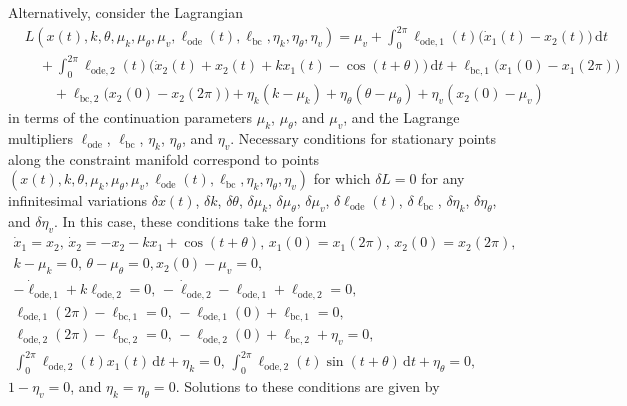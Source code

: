 Alternatively, consider the Lagrangian
\begin{align}
&L\left(x(t),k,\theta,\mu_k,\mu_\theta,\mu_v,\ell_\mathrm{ode}(t),\ell_\mathrm{bc},\eta_k,\eta_\theta,\eta_v\right)=\mu_v+\int_0^{2\pi}\ell_{\mathrm{ode},1}(t)\big(\dot{x}_1(t)-x_2(t)\big)\,\mathrm{d}t\nonumber\\
&\quad+\int_0^{2\pi}\ell_{\mathrm{ode},2}(t)\big(\dot{x}_2(t)+x_2(t)+kx_1(t)-\cos(t+\theta)\big)\,\mathrm{d}t+\ell_{\mathrm{bc},1}\big(x_1(0)-x_1(2\pi)\big)\nonumber\\
&\quad\quad+\ell_{\mathrm{bc},2}\big(x_2(0)-x_2(2\pi)\big)+\eta_k\left(k-\mu_k\right)+\eta_\theta\left(\theta-\mu_\theta\right)+\eta_v\left(x_2(0)-\mu_v\right)
\end{align}
in terms of the continuation parameters $\mu_k$, $\mu_\theta$, and $\mu_v$, and the Lagrange multipliers $\ell_\mathrm{ode}$, $\ell_\mathrm{bc}$, $\eta_k$, $\eta_\theta$, and $\eta_v$. Necessary conditions for stationary points along the constraint manifold correspond to points $\left(x(t),k,\theta,\mu_k,\mu_\theta,\mu_v,\ell_\mathrm{ode}(t),\ell_\mathrm{bc},\eta_k,\eta_\theta,\eta_v\right)$ for which $\delta L=0$ for any infinitesimal variations $\delta x(t)$, $\delta k$, $\delta \theta$, $\delta\mu_k$, $\delta\mu_\theta$, $\delta\mu_v$, $\delta\ell_\mathrm{ode}(t)$, $\delta\ell_\mathrm{bc}$, $\delta\eta_k$, $\delta\eta_\theta$, and $\delta\eta_v$. In this case, these conditions take the form
\begin{gather}
\dot{x}_1=x_2,\,\dot{x}_2=-x_2-kx_1+\cos (t+\theta),\,x_1(0)=x_1(2\pi),\,x_2(0)=x_2(2\pi),
\label{eq:linodenec1}\\
k-\mu_k=0,\,\theta-\mu_\theta=0,x_2(0)-\mu_v=0,
\label{eq:linodenec2}\\
-\dot{\ell}_{\mathrm{ode},1}+k\ell_{\mathrm{ode},2}=0,\,-\dot{\ell}_{\mathrm{ode},2}-\ell_{\mathrm{ode},1}+\ell_{\mathrm{ode},2}=0,
\label{eq:linodenec3}\\
\ell_{\mathrm{ode},1}(2\pi)-\ell_{\mathrm{bc},1}=0,\,-\ell_{\mathrm{ode},1}(0)+\ell_{\mathrm{bc},1}=0,
\label{eq:linodenec4}\\
\ell_{\mathrm{ode},2}(2\pi)-\ell_{\mathrm{bc},2}=0,\,-\ell_{\mathrm{ode},2}(0)+\ell_{\mathrm{bc},2}+\eta_v=0,
\label{eq:linodenec5}\\
\int_0^{2\pi}\ell_{\mathrm{ode},2}(t)x_1(t)\,\mathrm{d}t+\eta_k=0,\,\int_0^{2\pi}\ell_{\mathrm{ode},2}(t)\sin(t+\theta)\,\mathrm{d}t+\eta_\theta=0,
\label{eq:linodenec6}
\end{gather}
$1-\eta_v=0$, and $\eta_k=\eta_\theta=0$. Solutions to these conditions are given by
